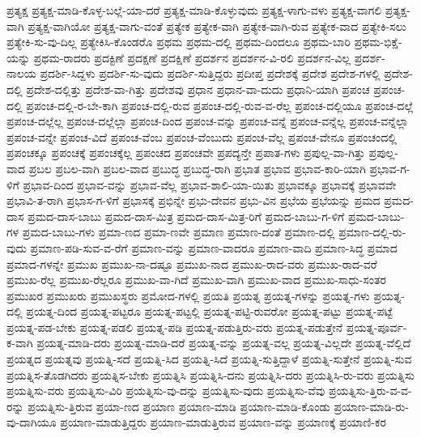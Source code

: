 {ಪ್ರತ್ಯಕ್ಷ
ಪ್ರತ್ಯಕ್ಷ-ಮಾಡಿ-ಕೊಳ್ಳ-ಬಲ್ಲೆ-ಯಾ-ದರೆ
ಪ್ರತ್ಯಕ್ಷ-ಮಾಡಿ-ಕೊಳ್ಳುವುದು
ಪ್ರತ್ಯಕ್ಷ-ಳಾಗು-ವಳು
ಪ್ರತ್ಯಕ್ಷ-ವಾಗಲಿ
ಪ್ರತ್ಯಕ್ಷ-ವಾಗಿ
ಪ್ರತ್ಯಕ್ಷ-ವಾಗಿಯೋ
ಪ್ರತ್ಯಕ್ಷ-ವಾಗು-ವಂತೆ
ಪ್ರತ್ಯೇಕ
ಪ್ರತ್ಯೇಕ-ವಾಗಿ
ಪ್ರತ್ಯೇಕ-ವಾಗಿ-ರುವ
ಪ್ರತ್ಯೇಕ-ವಾದ
ಪ್ರತ್ಯೇಕಿ-ಸಲು
ಪ್ರತ್ಯೇಕಿ-ಸು-ವು-ದಿಲ್ಲ
ಪ್ರತ್ಯೇಕಿಸಿ-ಕೊಂಡರೊ
ಪ್ರಥಮ
ಪ್ರಥಮ-ದಲ್ಲಿ
ಪ್ರಥಮ-ದಿಂದಲೂ
ಪ್ರಥಮ-ಬಾರಿ
ಪ್ರಥಮ-ಭಿಕ್ಷೆ-ಯನ್ನು
ಪ್ರಥಮ-ರಾದರು
ಪ್ರದಕ್ಟಿಣೆ
ಪ್ರದಕ್ಷಣೆ
ಪ್ರದಕ್ಷಿಣೆ
ಪ್ರದರ್ಶನ
ಪ್ರದರ್ಶನ-ವಿ-ರಲಿ
ಪ್ರದರ್ಶನ-ವಿಲ್ಲ
ಪ್ರದರ್ಶ-ನಾಲಯ
ಪ್ರದರ್ಶಿ-ಸಿದ್ದಳು
ಪ್ರದರ್ಶಿ-ಸು-ವುದು
ಪ್ರದರ್ಶಿ-ಸುತ್ತಿದ್ದರು
ಪ್ರದೀಪ್ತ
ಪ್ರದೇಶಕ್ಕೆ
ಪ್ರದೇಶ
ಪ್ರದೇಶ-ಗಳಲ್ಲಿ
ಪ್ರದೇಶ-ದಲ್ಲಿ
ಪ್ರದೇಶ-ದಲ್ಲಿತ್ತು
ಪ್ರದೇಶ-ವಾ-ಗಿತ್ತು
ಪ್ರದೇಶವು
ಪ್ರಧಾನ
ಪ್ರಧಾನ-ವಾ-ದುದು
ಪ್ರಧಾನಿ-ಯಾಗಿ
ಪ್ರಪಂಚ
ಪ್ರಪಂಚ-ದಲ್ಲಿ
ಪ್ರಪಂಚ-ದಲ್ಲಿ-ರ-ಬೇ-ಕಾಗಿ
ಪ್ರಪಂಚ-ದಲ್ಲಿ-ರುವ
ಪ್ರಪಂಚ-ದಲ್ಲಿ-ರುವ-ವ-ರೆಲ್ಲ
ಪ್ರಪಂಚ-ದಲ್ಲಿಯೂ
ಪ್ರಪಂಚ-ದಲ್ಲೆ
ಪ್ರಪಂಚ-ದಲ್ಲೆಲ್ಲ
ಪ್ರಪಂಚ-ದಲ್ಲೆಲ್ಲಾ
ಪ್ರಪಂಚ-ದಿಂದ
ಪ್ರಪಂಚ-ವನ್ನು
ಪ್ರಪಂಚ-ವನ್ನೆ
ಪ್ರಪಂಚ-ವನ್ನೆಲ್ಲ
ಪ್ರಪಂಚ-ವನ್ನೆಲ್ಲಾ
ಪ್ರಪಂಚ-ವನ್ನೇ
ಪ್ರಪಂಚ-ವಿದೆ
ಪ್ರಪಂಚ-ವೆಂಬ
ಪ್ರಪಂಚ-ವೆಂಬುದು
ಪ್ರಪಂಚ-ವೆಲ್ಲ
ಪ್ರಪಂಚ-ವೇನೂ
ಪ್ರಪಂಚಂದಲ್ಲಿ
ಪ್ರಪಂಚಕ್ಕೂ
ಪ್ರಪಂಚಕ್ಕೆ
ಪ್ರಪಂಚಕ್ಕೆಲ್ಲ
ಪ್ರಪಂಚದ
ಪ್ರಪಂಚವೇ
ಪ್ರಪದ್ಯನ್ತೇ
ಪ್ರಪಾತ-ಗಳು
ಪ್ರಪುಲ್ಲ-ವಾ-ಗಿತ್ತು
ಪ್ರಪುಲ್ಲ-ವಾದ
ಪ್ರಬಲ
ಪ್ರಬಲ-ವಾಗಿ
ಪ್ರಬಲ-ವಾದ
ಪ್ರಬುದ್ಧ
ಪ್ರಬುದ್ಧ-ರಾಗಿ
ಪ್ರಭಾತ
ಪ್ರಭಾವ
ಪ್ರಭಾವ-ಕಾರಿ-ಯಾಗಿ
ಪ್ರಭಾವ-ಗ-ಳಿಗೆ
ಪ್ರಭಾವ-ದಿಂದ
ಪ್ರಭಾವ-ವನ್ನು
ಪ್ರಭಾವ-ವೆಲ್ಲ
ಪ್ರಭಾವ-ಶಾಲಿ-ಯಾ-ಯಿತು
ಪ್ರಭಾವಕ್ಕೂ
ಪ್ರಭಾವಕ್ಕೆ
ಪ್ರಭಾವವೇ
ಪ್ರಭಾವಿ-ತ-ರಾಗಿ
ಪ್ರಭಾಸ-ಗ-ಳಿಗೆ
ಪ್ರಭಾಸಕ್ಕೆ
ಪ್ರಭಿನ್ನೇ
ಪ್ರಭು-ದೇವನ
ಪ್ರಭು-ವಿನ
ಪ್ರಭೆಯ
ಪ್ರಭೆಯನ್ನು
ಪ್ರಮದ
ಪ್ರಮದ-ದಾಸ
ಪ್ರಮದ-ದಾಸ-ಬಾಬು
ಪ್ರಮದ-ದಾಸ-ಮಿತ್ರ
ಪ್ರಮದ-ದಾಸ-ಮಿತ್ರ-ರಿಗೆ
ಪ್ರಮದ-ಬಾಬು-ಗ-ಳಿಗೆ
ಪ್ರಮದ-ಬಾಬು-ಗಳ
ಪ್ರಮದ-ಬಾಬು-ಗಳು
ಪ್ರಮಾ-ಣದ
ಪ್ರಮಾ-ಣವೇ
ಪ್ರಮಾಣ
ಪ್ರಮಾಣ-ದಂತೆ
ಪ್ರಮಾಣ-ದಲ್ಲಿ
ಪ್ರಮಾಣ-ದಲ್ಲಿ-ರು-ವುದು
ಪ್ರಮಾಣ-ಪಡಿ-ಸುವ-ವ-ರೆಗೆ
ಪ್ರಮಾಣ-ವನ್ನು
ಪ್ರಮಾಣ-ವಾದರೂ
ಪ್ರಮಾಣ-ವಾದಿ
ಪ್ರಮಾಣ-ಸಿದ್ಧ
ಪ್ರಮಾದ
ಪ್ರಮಾದ-ಗಳನ್ನೇ
ಪ್ರಮುಖ
ಪ್ರಮುಖ-ನಾ-ದಷ್ಟೂ
ಪ್ರಮುಖ-ನಾದ
ಪ್ರಮುಖ-ರಾದ-ವರು
ಪ್ರಮುಖ-ರಾದ-ವರೆ
ಪ್ರಮುಖ-ರೆಲ್ಲ
ಪ್ರಮುಖ-ರೆಲ್ಲರೂ
ಪ್ರಮುಖ-ವಾ-ಗಿದೆ
ಪ್ರಮುಖ-ವಾಗಿ
ಪ್ರಮುಖ-ವಾದ
ಪ್ರಮುಖ-ಸಾಧು-ಸಂತರ
ಪ್ರಮುಖರ
ಪ್ರಮುಖರು
ಪ್ರಮುಖಸ್ಥರು
ಪ್ರಮೋದ-ಗಳಲ್ಲಿ
ಪ್ರಯತಿ
ಪ್ರಯತ್ನ
ಪ್ರಯತ್ನ-ಗಳನ್ನು
ಪ್ರಯತ್ನ-ಗಳು
ಪ್ರಯತ್ನ-ದಲ್ಲಿ
ಪ್ರಯತ್ನ-ದಿಂದ
ಪ್ರಯತ್ನ-ಪಟ್ಟರೂ
ಪ್ರಯತ್ನ-ಪಟ್ಟಲ್ಲಿ
ಪ್ರಯತ್ನ-ಪಟ್ಟಿ-ರುವರೋ
ಪ್ರಯತ್ನ-ಪಟ್ಟು
ಪ್ರಯತ್ನ-ಪಟ್ಟೆ
ಪ್ರಯತ್ನ-ಪಡ-ಬೇಕು
ಪ್ರಯತ್ನ-ಪಡಲಿ
ಪ್ರಯತ್ನ-ಪಡಿ
ಪ್ರಯತ್ನ-ಪಡುತ್ತಿರು-ವರು
ಪ್ರಯತ್ನ-ಪಡುತ್ತೇನೆ
ಪ್ರಯತ್ನ-ಪೂರ್ವ-ಕ-ವಾಗಿ
ಪ್ರಯತ್ನ-ಮಾಡಿ-ದರು
ಪ್ರಯತ್ನ-ಮಾಡಿ-ದರೆ
ಪ್ರಯತ್ನ-ವನ್ನು
ಪ್ರಯತ್ನ-ವಲ್ಲ
ಪ್ರಯತ್ನ-ವಿಲ್ಲದೇ
ಪ್ರಯತ್ನ-ವೆಲ್ಲಿದೆ
ಪ್ರಯತ್ನದ
ಪ್ರಯತ್ನವು
ಪ್ರಯತ್ನಿ-ಸದೆ
ಪ್ರಯತ್ನಿ-ಸಿದ
ಪ್ರಯತ್ನಿ-ಸಿದೆ
ಪ್ರಯತ್ನಿ-ಸುತ್ತಿದ್ದಾಳೆ
ಪ್ರಯತ್ನಿ-ಸುತ್ತೇನೆ
ಪ್ರಯತ್ನಿ-ಸುವ
ಪ್ರಯತ್ನಿಸ-ತೊಡಗಿದರು
ಪ್ರಯತ್ನಿಸ-ಬೇಕು
ಪ್ರಯತ್ನಿಸಿ
ಪ್ರಯತ್ನಿಸಿ-ದನು
ಪ್ರಯತ್ನಿಸಿ-ದರು
ಪ್ರಯತ್ನಿಸಿ-ರು-ವರು
ಪ್ರಯತ್ನಿಸು
ಪ್ರಯತ್ನಿಸು-ವರು
ಪ್ರಯತ್ನಿಸು-ವಿರಿ
ಪ್ರಯತ್ನಿಸು-ವು-ದನ್ನು
ಪ್ರಯತ್ನಿಸು-ವುದು
ಪ್ರಯತ್ನಿಸು-ವೆವು
ಪ್ರಯತ್ನಿಸು-ತ್ತಿರು-ವ-ವ-ರನ್ನು
ಪ್ರಯತ್ನಿಸು-ತ್ತಿರುವ
ಪ್ರಯಾ-ಣದ
ಪ್ರಯಾಣ
ಪ್ರಯಾಣ-ಮಾಡಿ
ಪ್ರಯಾಣ-ಮಾಡಿ-ಕೊಂಡು
ಪ್ರಯಾಣ-ಮಾಡಿ-ರು-ವು-ದಾಗಿಯೂ
ಪ್ರಯಾಣ-ಮಾಡುತ್ತಿದ್ದರು
ಪ್ರಯಾಣ-ಮಾಡುತ್ತಿರುವ
ಪ್ರಯಾಣ-ವನ್ನು
ಪ್ರಯಾಣಕ್ಕೆ
ಪ್ರಯಾಣಿ-ಕರ
}
